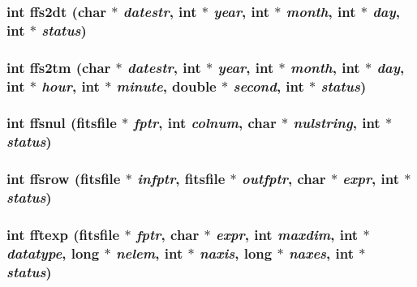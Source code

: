 \subsubsection{\setlength{\rightskip}{0pt plus 5cm}int ffs2dt (char $\ast$ {\em datestr}, int $\ast$ {\em year}, int $\ast$ {\em month}, int $\ast$ {\em day}, int $\ast$ {\em status})}\label{test_2shm__client_2fitsio_8h_088b875388fc72d3d8ad8134a025f00c}


\subsubsection{\setlength{\rightskip}{0pt plus 5cm}int ffs2tm (char $\ast$ {\em datestr}, int $\ast$ {\em year}, int $\ast$ {\em month}, int $\ast$ {\em day}, int $\ast$ {\em hour}, int $\ast$ {\em minute}, double $\ast$ {\em second}, int $\ast$ {\em status})}\label{test_2shm__client_2fitsio_8h_1f6250df0ad32ae2dedecc8e87c5a0c4}


\subsubsection{\setlength{\rightskip}{0pt plus 5cm}int ffsnul (\bf{fitsfile} $\ast$ {\em fptr}, int {\em colnum}, char $\ast$ {\em nulstring}, int $\ast$ {\em status})}\label{test_2shm__client_2fitsio_8h_e37082cec0cc8a2faa07d2092b15028f}


\subsubsection{\setlength{\rightskip}{0pt plus 5cm}int ffsrow (\bf{fitsfile} $\ast$ {\em infptr}, \bf{fitsfile} $\ast$ {\em outfptr}, char $\ast$ {\em expr}, int $\ast$ {\em status})}\label{test_2shm__client_2fitsio_8h_a51c12d3b8193a1f70ec5887735d715e}


\subsubsection{\setlength{\rightskip}{0pt plus 5cm}int fftexp (\bf{fitsfile} $\ast$ {\em fptr}, char $\ast$ {\em expr}, int {\em maxdim}, int $\ast$ {\em datatype}, long $\ast$ {\em nelem}, int $\ast$ {\em naxis}, long $\ast$ {\em naxes}, int $\ast$ {\em status})}\label{test_2shm__client_2fitsio_8h_8464a713d9b0107bee75323d75ddc5a8}


